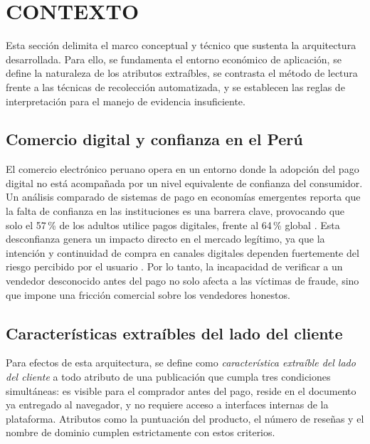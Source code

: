
\section{CONTEXTO}

Esta sección delimita el marco conceptual y técnico que sustenta la arquitectura desarrollada. 
Para ello, se fundamenta el entorno económico de aplicación, se define la naturaleza de los atributos extraíbles, 
se contrasta el método de lectura frente a las técnicas de recolección automatizada, y se establecen 
las reglas de interpretación para el manejo de evidencia insuficiente.

\subsection{Comercio digital y confianza en el Perú}

El comercio electrónico peruano opera en un entorno donde la adopción del pago digital no está acompañada por un nivel equivalente de confianza del consumidor. 
Un análisis comparado de sistemas de pago en economías emergentes reporta que la falta de confianza en las instituciones es una barrera clave, provocando que
solo el 57\,\% de los adultos utilice pagos digitales, frente al 64\,\% global \cite{ref26}.
Esta desconfianza genera un impacto directo en el mercado legítimo, ya que la intención y continuidad de compra en canales digitales dependen fuertemente del riesgo percibido por el usuario
\cite{ref21} \cite{ref6}. 
Por lo tanto, la incapacidad de verificar a un vendedor desconocido antes del pago no solo afecta a las víctimas de fraude, 
sino que impone una fricción comercial sobre los vendedores honestos.

\subsection{Características extraíbles del lado del cliente}

Para efectos de esta arquitectura, se define como \emph{característica extraíble del lado del cliente} a todo atributo de una publicación que cumpla tres condiciones simultáneas: es visible para el comprador antes del pago, reside en el documento ya entregado al navegador, y no requiere acceso a interfaces internas de la plataforma. 
Atributos como la puntuación del producto, el número de reseñas y el nombre de dominio cumplen estrictamente con estos criterios.

